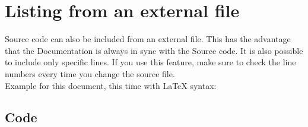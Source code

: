 \section{Listing from an external file}
Source code can also be included from an external file. This has the advantage 
that the Documentation is always in sync with the Source code. It is also 
possible to include only specific lines. If you use this feature, make sure to 
check the line numbers every time you change the source file. \\
Example for this document, this time with LaTeX syntax:

\subsection{Code}
